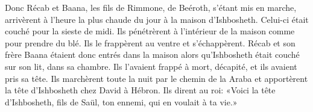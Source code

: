 Donc Récab et Baana, les fils de Rimmone, de Beéroth, s’étant mis en marche,
	arrivèrent à l’heure la plus chaude du jour à la maison d’Ishbosheth.
Celui-ci était couché pour la sieste de midi.
Ils pénétrèrent à l’intérieur de la maison comme pour prendre du blé.
	Ils le frappèrent au ventre et s’échappèrent.
Récab et son frère Baana étaient donc entrés dans la maison
	alors qu’Ishbosheth était couché sur son lit, dans sa chambre.
Ils l’avaient frappé à mort, décapité, et ils avaient pris sa tête.
Ils marchèrent toute la nuit par le chemin de la Araba
	et apportèrent la tête d’Ishbosheth chez David à Hébron.
Ils dirent au roi: «Voici la tête d’Ishbosheth, fils de Saül,
	ton ennemi, qui en voulait à ta vie.»
